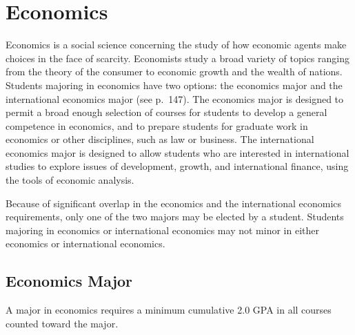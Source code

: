 \documentclass[
  letterpaper,
]{scrbook}
\begin{document}
\section{Economics}\label{economics}

Economics is a social science concerning the study of how economic
agents make choices in the face of scarcity. Economists study a broad
variety of topics ranging from the theory of the consumer to economic
growth and the wealth of nations. Students majoring in economics have
two options: the economics major and the international economics major
(see p.~147). The economics major is designed to permit a broad enough
selection of courses for students to develop a general competence in
economics, and to prepare students for graduate work in economics or
other disciplines, such as law or business. The international economics
major is designed to allow students who are interested in international
studies to explore issues of development, growth, and international
finance, using the tools of economic analysis.

Because of significant overlap in the economics and the international
economics requirements, only one of the two majors may be elected by a
student. Students majoring in economics or international economics may
not minor in either economics or international economics.

\subsection{Economics Major}\label{economics-major}

A major in economics requires a minimum cumulative 2.0 GPA in all
courses counted toward the major.
\end{document}
